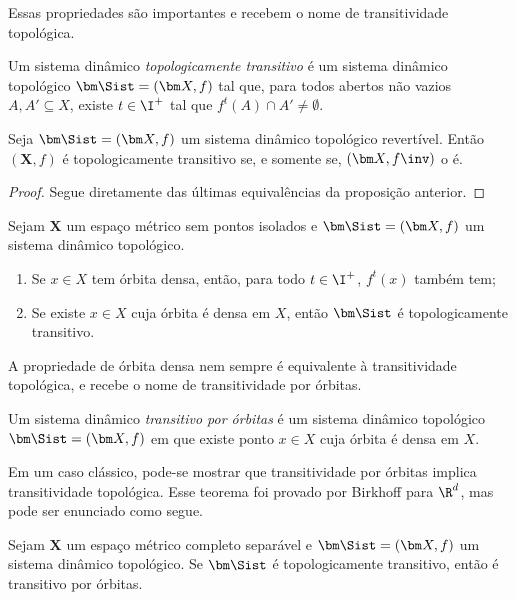 Essas propriedades são importantes e recebem o nome de transitividade topológica.

\begin{definition}
Um  sistema dinâmico \emph{topologicamente transitivo} é um sistema dinâmico topológico $\bm\Sist = (\bm X,f)$ tal que, para todos abertos não vazios $A,A' \subseteq X$, existe $t \in \I^+$ tal que $f^t(A) \cap A' \neq \emptyset$.
\end{definition}

\begin{proposition}
Seja $\bm\Sist = (\bm X,f)$ um sistema dinâmico topológico revertível. Então $(\bm X,f)$ é topologicamente transitivo se, e somente se, $(\bm X,f\inv)$ o é.
\end{proposition}
\begin{proof}
Segue diretamente das últimas equivalências da proposição anterior.
\end{proof}


\begin{proposition}
Sejam $\bm X$ um espaço métrico sem pontos isolados e $\bm\Sist = (\bm X,f)$ um sistema dinâmico topológico.
	\begin{enumerate}
	\item Se $x \in X$ tem órbita densa, então, para todo $t \in \I^+$, $f^t(x)$ também tem;
	\item Se existe $x \in X$ cuja órbita é densa em $X$, então $\bm\Sist$ é topologicamente transitivo.
	\end{enumerate}
\end{proposition}

A propriedade de órbita densa nem sempre é equivalente à transitividade topológica, e recebe o nome de transitividade por órbitas.

\begin{definition}
Um sistema dinâmico \emph{transitivo por órbitas} é um sistema dinâmico topológico $\bm\Sist=(\bm X,f)$ em que existe ponto $x \in X$ cuja órbita é densa em $X$.
\end{definition}

Em um caso clássico, pode-se mostrar que transitividade por órbitas implica transitividade topológica. Esse teorema foi provado por Birkhoff para $\R^d$, mas pode ser enunciado como segue.

\begin{proposition}
Sejam $\bm X$ um espaço métrico completo separável e $\bm\Sist = (\bm X,f)$ um sistema dinâmico topológico. Se $\bm\Sist$ é topologicamente transitivo, então é transitivo por órbitas.
\end{proposition}












